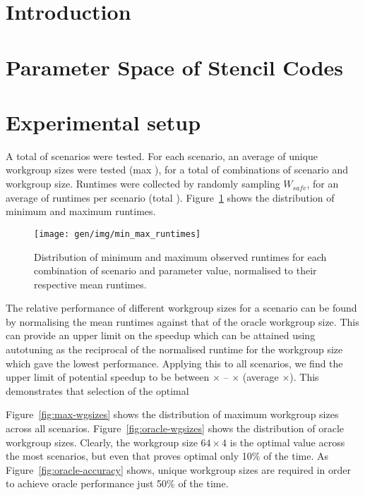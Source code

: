 \section{Introduction}

\section{Parameter Space of Stencil Codes}

\section{Experimental setup}

A total of  scenarios were tested. For each
scenario, an average of  unique workgroup
sizes were tested (max ), for a total of
 combinations of scenario and workgroup
size. Runtimes were collected by randomly sampling $W_{safe}$, for an
average of  runtimes per scenario (total
). Figure~\ref{fig:min-max-runtimes} shows the
distribution of minimum and maximum runtimes.

\begin{figure}
\centering
\texttt{[image: gen/img/min\_max\_runtimes]}
\caption{%
  Distribution of minimum and maximum observed runtimes for each
  combination of scenario and parameter value, normalised to their
  respective mean runtimes.%
}
\label{fig:min-max-runtimes}
\end{figure}

The relative performance of different workgroup sizes for a scenario
can be found by normalising the mean runtimes against that of the
oracle workgroup size. This can provide an upper limit on the speedup
which can be attained using autotuning as the reciprocal of the
normalised runtime for the workgroup size which gave the lowest
performance. Applying this to all scenarios, we find the upper limit
of potential speedup to be between
$\times$ --
$\times$ (average
$\times$). This demonstrates that
selection of the optimal

Figure~\ref{fig:max-wgsizes} shows the distribution of maximum
workgroup sizes across all scenarios. Figure~\ref{fig:oracle-wgsizes}
shows the distribution of oracle workgroup sizes. Clearly, the
workgroup size $64 \times 4$ is the optimal value across the most
scenarios, but even that proves optimal only 10\% of the time. As
Figure~\ref{fig:oracle-accuracy} shows,
 unique workgroup sizes are
required in order to achieve oracle performance just 50\% of the time.


